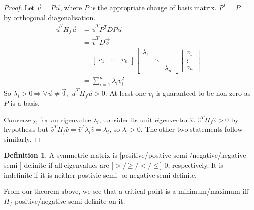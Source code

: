 \documentclass{article}
\theoremstyle{definition}
\newtheorem{defn}{Definition}[subsubsection]
\begin{document}
\begin{proof}
	Let $\vec{v}=P\vec{u}$, where $P$ is the appropriate change of basis matrix. $P^T=P^-$ by orthogonal diagonalisation.
	\begin{align*}
		\vec{u}^TH_f\vec{u}&=\vec{u}^TP^{T}DP\vec{u}\\
		&=\vec{v}^TD\vec{v}\\
		&=\begin{bmatrix}v_1&\cdots&v_n\end{bmatrix}\begin{bmatrix}\lambda_1&&\\&\ddots&\\&&\lambda_n\end{bmatrix}\begin{bmatrix}v_1\\\vdots\\v_n\end{bmatrix}\\
		&=\sum_{i=1}^n\lambda_iv_i^2
	\end{align*}
	So $\lambda_i>0\Rightarrow\forall\vec{u}\not=\vec{0},\;\vec{u}^TH_f\vec{u}>0$. At least one $v_i$ is guaranteed to be non-zero as $P$ is a basis.\par
	
	Conversely, for an eigenvalue $\lambda_i$, consider its unit eigenvector $\hat v$. $\hat v^TH_f\hat v>0$ by hypothesis but $\hat v^TH_f\hat v=\hat v^T\lambda_i\hat v=\lambda_i$, so $\lambda_i>0$. The other two statements follow similarly.
\end{proof}
\begin{defn}
	A symmetric matrix is [positive/positive semi-/negative/negative semi-] definite if all eigenvalues are [$>/\geq/</\leq$] 0, respectively. It is indefinite if it is neither postivie semi- or negative semi-definite.
\end{defn}
From our theorem above, we see that a critical point is a minimum/maximum iff $H_f$ positive/negative semi-definite on it.\par
\end{document}
